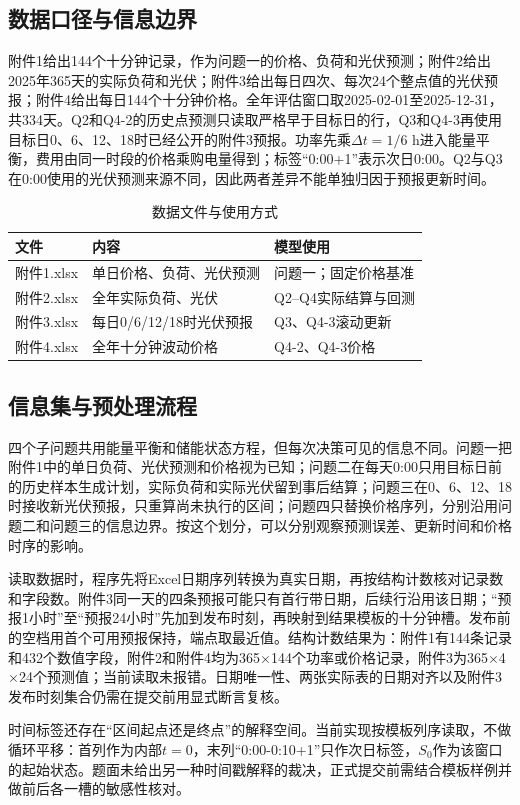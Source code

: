\documentclass[UTF8,12pt,a4paper]{ctexart}
\begin{document}
\subsection{数据口径与信息边界}
附件1给出144个十分钟记录，作为问题一的价格、负荷和光伏预测；附件2给出2025年365天的实际负荷和光伏；附件3给出每日四次、每次24个整点值的光伏预报；附件4给出每日144个十分钟价格。全年评估窗口取2025-02-01至2025-12-31，共334天。Q2和Q4-2的历史点预测只读取严格早于目标日的行，Q3和Q4-3再使用目标日0、6、12、18时已经公开的附件3预报。功率先乘\(\Delta t=1/6\) h进入能量平衡，费用由同一时段的价格乘购电量得到；标签“0:00+1”表示次日0:00。Q2与Q3在0:00使用的光伏预测来源不同，因此两者差异不能单独归因于预报更新时间。
\begin{table}[H]\centering\caption{数据文件与使用方式}\label{tab:data}\begin{tabular}{lll}\toprule 文件&内容&模型使用\\\midrule
附件1.xlsx&单日价格、负荷、光伏预测&问题一；固定价格基准\\
附件2.xlsx&全年实际负荷、光伏&Q2--Q4实际结算与回测\\
附件3.xlsx&每日0/6/12/18时光伏预报&Q3、Q4-3滚动更新\\
附件4.xlsx&全年十分钟波动价格&Q4-2、Q4-3价格\\\bottomrule\end{tabular}\end{table}
\subsection{信息集与预处理流程}
四个子问题共用能量平衡和储能状态方程，但每次决策可见的信息不同。问题一把附件1中的单日负荷、光伏预测和价格视为已知；问题二在每天0:00只用目标日前的历史样本生成计划，实际负荷和实际光伏留到事后结算；问题三在0、6、12、18时接收新光伏预报，只重算尚未执行的区间；问题四只替换价格序列，分别沿用问题二和问题三的信息边界。按这个划分，可以分别观察预测误差、更新时间和价格时序的影响。

读取数据时，程序先将Excel日期序列转换为真实日期，再按结构计数核对记录数和字段数。附件3同一天的四条预报可能只有首行带日期，后续行沿用该日期；“预报1小时”至“预报24小时”先加到发布时刻，再映射到结果模板的十分钟槽。发布前的空档用首个可用预报保持，端点取最近值。结构计数结果为：附件1有144条记录和432个数值字段，附件2和附件4均为365\(\times\)144个功率或价格记录，附件3为365\(\times\)4\(\times\)24个预测值；当前读取未报错。日期唯一性、两张实际表的日期对齐以及附件3发布时刻集合仍需在提交前用显式断言复核。

时间标签还存在“区间起点还是终点”的解释空间。当前实现按模板列序读取，不做循环平移：首列作为内部$t=0$，末列“0:00-0:10+1”只作次日标签，$S_0$作为该窗口的起始状态。题面未给出另一种时间戳解释的裁决，正式提交前需结合模板样例并做前后各一槽的敏感性核对。
\end{document}
